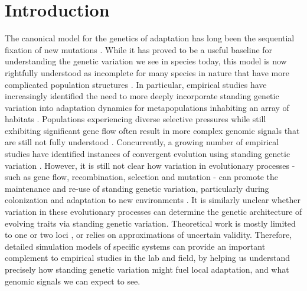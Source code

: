 \documentclass{article}
\newcommand{\plr}[1]{\todo[linecolor=blue,backgroundcolor=blue!25,bordercolor=blue]{#1}}
\begin{document}
\section*{Introduction}

The canonical model for the genetics of adaptation has long been the sequential fixation of new mutations 
\citep{smith_haigh_1974, Endler_1977, Orr_2005}.
While it has proved to be a useful baseline for understanding the genetic variation we see in species today, this model is now rightfully understood as incomplete for many species in nature that have more complicated population structures 
\citep{Lai2152, Schrider2017}. 
In particular, empirical studies have increasingly identified the need to more deeply incorporate standing genetic variation into adaptation dynamics for metapopulations inhabiting an array of habitats 
\citep{Hermisson_2008, Barrett2008}. 
Populations experiencing diverse selective pressures while still exhibiting significant gene flow often result in more complex genomic signals that are still not fully understood 
\citep{Charlesworth_1997, Charlesworth_2003, Nosil_2009, Flaxman_2013, Samuk_2017}. 
Concurrently, a growing number of empirical studies have identified instances of convergent evolution using standing genetic variation 
\citep{Schrider2017, Barrett2008, Nelson_2018, Nelson_2019, Bassham_2018}. 
However, it is still not clear how variation in evolutionary processes - such as gene flow, recombination, selection and mutation -  can promote the maintenance and re-use of standing genetic variation, particularly during colonization and adaptation to new environments
\citep{nelson2017ancient, Pritchard_2010, yeaman2011genetic, Schrider2017}. 
It is similarly unclear whether variation in these evolutionary processes can determine the genetic architecture of evolving traits via standing genetic variation. 
Theoretical work is mostly limited to one or two loci \plr{CITE}, or relies on approximations of uncertain validity.
Therefore, detailed simulation models of specific systems can 
provide an important complement to empirical studies in the lab and field,
by helping us understand precisely how standing genetic variation might fuel local adaptation,
and what genomic signals we can expect to see.
\end{document}
